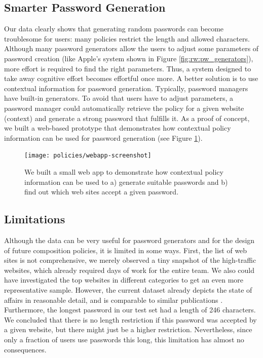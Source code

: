 \subsection{Smarter Password Generation}
Our data clearly shows that generating random passwords can become troublesome for users: many policies restrict the length and allowed characters. Although many password generators allow the users to adjust some parameters of password creation (like Apple's system shown in Figure \ref{fig:rw:pw_generators}), more effort is required to find the right parameters. Thus, a system designed to take away cognitive effort becomes effortful once more. A better solution is to use contextual information for password generation. Typically, password managers have built-in generators. To avoid that users have to adjust parameters, a password manager could automatically retrieve the policy for a given website (context) and generate a strong password that fulfills it. As a proof of concept, we built a web-based prototype that demonstrates how contextual policy information can be used for password generation (see Figure \ref{fig:policies_reuse:webapp}). 

\begin{figure}
	\centering
	\texttt{[image: policies/webapp-screenshot]}
	\caption{\label{fig:policies_reuse:webapp}We built a small web app to demonstrate how contextual policy information can be used to a) generate suitable passwords and b) find out which web sites accept a given password.}
\end{figure}

\subsection{Limitations}
Although the data can be very useful for password generators and for the design of future composition policies, it is limited in some ways. 
First, the list of web sites is not comprehensive, we merely observed a tiny snapshot of the high-traffic websites, which already required days of work for the entire team. We also could have investigated the top websites in different categories to get an even more representative sample. However, the current dataset already depicts the state of affairs in reasonable detail, and is comparable to similar publications \cite{Florencio2010WhereDoPoliciesComeFrom, Wang2015EmperorsPolicies}. 
Furthermore, the longest password in our test set had a length of 246 characters. We concluded that there is no length restriction if this password was accepted by a given website, but there might just be a higher restriction. Nevertheless, since only a fraction of users use passwords this long, this limitation has almost no consequences.


